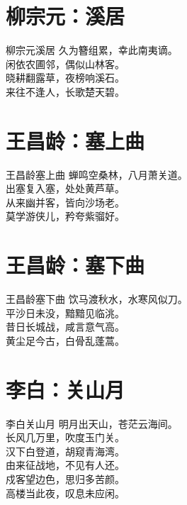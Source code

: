 \documentclass[12pt,oneside,a5paper]{book}
\begin{document}
\chapter{柳宗元：溪居}
\begin{poemzh}{柳宗元}{溪居}
久为簪组累，幸此南夷谪。\\
闲依农圃邻，偶似山林客。\\
晓耕翻露草，夜榜响溪石。\\
来往不逢人，长歌楚天碧。\\ 
\end{poemzh}

\chapter{王昌龄：塞上曲}
\begin{poemzh}{王昌龄}{塞上曲}
蝉鸣空桑林，八月萧关道。\\
出塞复入塞，处处黄芦草。\\
从来幽并客，皆向沙场老。\\
莫学游侠儿，矜夸紫骝好。\\ 
\end{poemzh}


\chapter{王昌龄：塞下曲}
\begin{poemzh}{王昌龄}{塞下曲}
饮马渡秋水，水寒风似刀。\\
平沙日未没，黯黯见临洮。\\
昔日长城战，咸言意气高。\\
黄尘足今古，白骨乱蓬蒿。\\ 
\end{poemzh}

\chapter{李白：关山月}
\begin{poemzh}{李白}{关山月}
明月出天山，苍茫云海间。\\
长风几万里，吹度玉门关。\\
汉下白登道，胡窥青海湾。\\
由来征战地，不见有人还。\\
戍客望边色，思归多苦颜。\\
高楼当此夜，叹息未应闲。\\ 
\end{poemzh}
\end{document}
